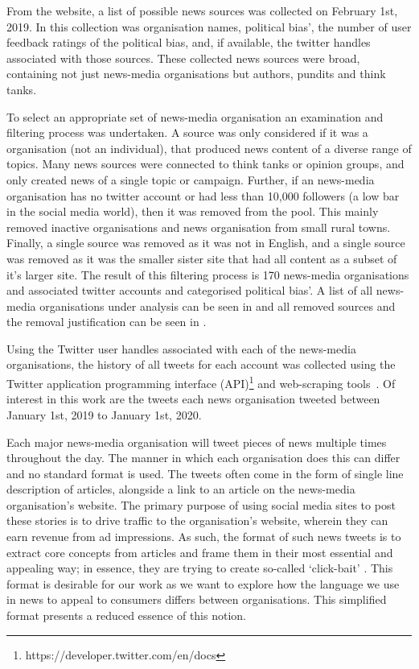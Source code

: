 From the website, a list of possible news sources was collected on February 1st, 2019. In this collection was organisation names, political bias', the number of user feedback ratings of the political bias, and, if available, the twitter handles associated with those sources. These collected news sources were broad, containing not just news-media organisations but authors, pundits and think tanks. 

To select an appropriate set of news-media organisation an examination and filtering process was undertaken. A source was only considered if it was a organisation (not an individual), that produced news content of a diverse range of topics. Many news sources were connected to think tanks or opinion groups, and only created news of a single topic or campaign. Further, if an news-media organisation has no twitter account or had less than 10,000 followers (a low bar in the social media world), then it was removed from the pool. This mainly removed inactive organisations and news organisation from small rural towns. Finally, a single source was removed as it was not in English, and a single source was removed as it was the smaller sister site that had all content as a subset of it's larger site.  The result of this filtering process is 170 news-media organisations and associated twitter accounts and categorised political bias'.  A list of all news-media organisations under analysis can be seen in \cite{app:accounts} and all removed sources and the removal justification can be seen in .


Using the Twitter user handles associated with each of the news-media organisations, the history of all tweets for each account was collected using the Twitter application programming interface (API)\footnote{https://developer.twitter.com/en/docs} and web-scraping tools~. Of interest in this work are the tweets each news organisation tweeted between January 1st, 2019 to January 1st, 2020. 

Each major news-media organisation will tweet pieces of news multiple times throughout the day. The manner in which each organisation does this can differ and no standard format is used. The tweets often come in the form of single line description of articles, alongside a link to an article on the news-media organisation's website. The primary purpose of using social media sites to post these stories is to drive traffic to the organisation's website, wherein they can earn revenue from ad impressions. As such, the format of such news tweets is to extract core concepts from articles and frame them in their most essential and appealing way; in essence, they are trying to create so-called `click-bait' . This format is desirable for our work as we want to explore how the language we use in news to appeal to consumers differs between organisations. This simplified format presents a reduced essence of this notion.

